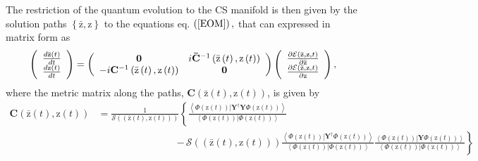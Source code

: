 \documentclass[aps,preprint]{revtex4}%
\begin{document}
The restriction of the quantum evolution to the CS manifold is then given by
the solution paths $\left\{  \mathrm{\bar{z},z}\right\}  $ to the equations
eq. $\left(  \ref{EOM}\right)  ,$ that can expressed in matrix form as
\begin{equation}
\left(
\begin{array}
[c]{c}%
\frac{d\mathrm{\bar{z}}\left(  t\right)  }{dt}\\
\frac{d\mathrm{z}\left(  t\right)  }{dt}%
\end{array}
\right)  =\left(
\begin{array}
[c]{cc}%
\mathbf{0} & i\mathbf{\bar{C}}^{-1}\left(  \mathrm{\bar{z}}\left(  t\right)
,\mathrm{z}\left(  t\right)  \right) \\
-i\mathbf{C}^{-1}\left(  \mathrm{\bar{z}}\left(  t\right)  ,\mathrm{z}\left(
t\right)  \right)  & \mathbf{0}%
\end{array}
\right)  \left(
\begin{array}
[c]{c}%
\frac{\partial\mathcal{E}\left(  \mathrm{\bar{z},z}\mathbf{,}t\right)
}{\partial\mathrm{\bar{z}}}\\
\frac{\partial\mathcal{E}\left(  \mathrm{\bar{z},z}\mathbf{,}t\right)
}{\partial\mathrm{z}}%
\end{array}
\right)  , \label{MEOM}%
\end{equation}
where the metric matrix along the paths, $\mathbf{C}\left(  \mathrm{\bar{z}%
}\left(  t\right)  ,\mathrm{z}\left(  t\right)  \right)  $, is given by
\begin{align}
\mathbf{C}\left(  \mathrm{\bar{z}}\left(  t\right)  ,\mathrm{z}\left(
t\right)  \right)   &  =\frac{1}{\mathcal{S}\left(  \left(  \mathrm{\bar{z}%
}\left(  t\right)  ,\mathrm{z}\left(  t\right)  \right)  \right)  }\left\{
\frac{\left\langle \left.  \Phi\left(  \mathrm{z}\left(  t\right)  \right)
\right\vert \mathbf{Y}^{\dagger}\mathbf{Y}\Phi\left(  \mathrm{z}\left(
t\right)  \right)  \right\rangle }{\left\langle \left.  \Phi\left(
\mathrm{z}\left(  t\right)  \right)  \right\vert \Phi\left(  \mathrm{z}\left(
t\right)  \right)  \right\rangle }\right. \nonumber\\
&  \qquad\qquad\qquad\qquad\left.  -\,\mathcal{S}\left(  \left(
\mathrm{\bar{z}}\left(  t\right)  ,\mathrm{z}\left(  t\right)  \right)
\right)  \frac{\left\langle \left.  \Phi\left(  \mathrm{z}\left(  t\right)
\right)  \right\vert \mathbf{Y}^{\dagger}\Phi\left(  \mathrm{z}\left(
t\right)  \right)  \right\rangle }{\left\langle \left.  \Phi\left(
\mathrm{z}\left(  t\right)  \right)  \right\vert \Phi\left(  \mathrm{z}\left(
t\right)  \right)  \right\rangle }\frac{\left\langle \left.  \Phi\left(
\mathrm{z}\left(  t\right)  \right)  \right\vert \mathbf{Y}\Phi\left(
\mathrm{z}\left(  t\right)  \right)  \right\rangle }{\left\langle \left.
\Phi\left(  \mathrm{z}\left(  t\right)  \right)  \right\vert \Phi\left(
\mathrm{z}\left(  t\right)  \right)  \right\rangle }\right\}
\end{align}
\end{document}
